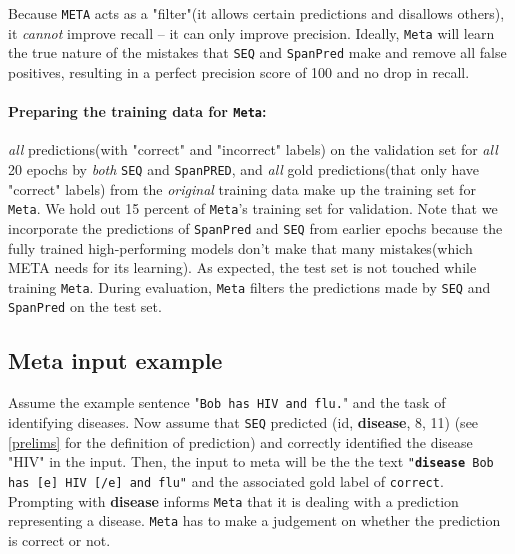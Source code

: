 \documentclass[11pt]{article}
\begin{document}
Because \texttt{META} acts as a "filter"(it allows certain predictions and disallows others), it \textit{cannot} improve recall -- it can only improve precision. Ideally, \texttt{Meta} will learn the true nature of the mistakes  that \texttt{SEQ} and \texttt{SpanPred} make and remove all false positives, resulting in a perfect precision score of 100 and no drop in recall. 

\paragraph{Preparing the training data for \texttt{Meta}:}
\textit{all} predictions(with "correct" and "incorrect" labels) on the validation set for \textit{all} 20 epochs by \textit{both} \texttt{SEQ} and \texttt{SpanPRED}, and \textit{all} gold predictions(that only have "correct" labels) from the \textit{original} training data make up the training set for \texttt{Meta}. We hold out 15 percent of \texttt{Meta}'s training set for validation. Note that we incorporate the predictions of \texttt{SpanPred} and \texttt{SEQ} from earlier epochs because the fully trained high-performing models don't make that many mistakes(which META needs for its learning). As expected, the test set is not touched while training \texttt{Meta}. During evaluation, \texttt{Meta} filters the predictions made by \texttt{SEQ} and \texttt{SpanPred} on the test set.
 
\subsection{Meta input example}\label{meta-example}
Assume the example sentence "\texttt{Bob has HIV and flu.}" and the task of identifying diseases. Now assume that \texttt{SEQ} predicted \newline (id, \textbf{disease}, 8, 11) (see \autoref{prelims} for the definition of prediction) and correctly identified the disease "HIV" in the input. Then, the input to meta will be the the text \texttt{"\textbf{disease} Bob has [e] HIV [/e] and flu"} and the associated gold label of \texttt{correct}. Prompting with \textbf{disease} informs \texttt{Meta} that it is dealing with a prediction representing a disease. \texttt{Meta} has to make a judgement on whether the prediction is correct or not. 
\end{document}
